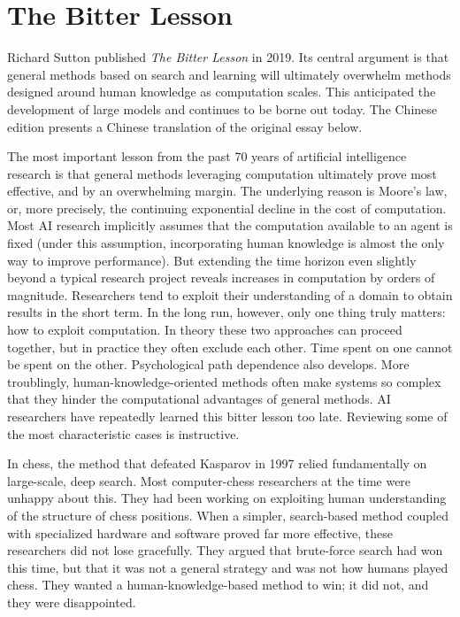 \setcounter{section}{5}

\hypertarget{the-bitter-lesson}{%
\section{The Bitter Lesson}\label{the-bitter-lesson}}

Richard Sutton published \emph{The Bitter Lesson} in 2019. Its central argument is that general methods based on search and learning will ultimately overwhelm methods designed around human knowledge as computation scales. This anticipated the development of large models and continues to be borne out today. The Chinese edition presents a Chinese translation of the original essay below.

The most important lesson from the past 70 years of artificial intelligence research is that general methods leveraging computation ultimately prove most effective, and by an overwhelming margin. The underlying reason is Moore's law, or, more precisely, the continuing exponential decline in the cost of computation. Most AI research implicitly assumes that the computation available to an agent is fixed (under this assumption, incorporating human knowledge is almost the only way to improve performance). But extending the time horizon even slightly beyond a typical research project reveals increases in computation by orders of magnitude. Researchers tend to exploit their understanding of a domain to obtain results in the short term. In the long run, however, only one thing truly matters: how to exploit computation. In theory these two approaches can proceed together, but in practice they often exclude each other. Time spent on one cannot be spent on the other. Psychological path dependence also develops. More troublingly, human-knowledge-oriented methods often make systems so complex that they hinder the computational advantages of general methods. AI researchers have repeatedly learned this bitter lesson too late. Reviewing some of the most characteristic cases is instructive.

In chess, the method that defeated Kasparov in 1997 relied fundamentally on large-scale, deep search. Most computer-chess researchers at the time were unhappy about this. They had been working on exploiting human understanding of the structure of chess positions. When a simpler, search-based method coupled with specialized hardware and software proved far more effective, these researchers did not lose gracefully. They argued that brute-force search had won this time, but that it was not a general strategy and was not how humans played chess. They wanted a human-knowledge-based method to win; it did not, and they were disappointed.

